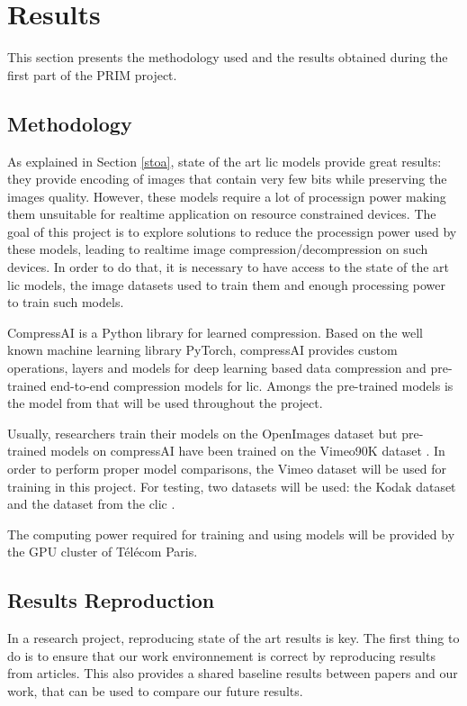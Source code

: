 \chapter{Results}
\label{results}
This section presents the methodology used and the results obtained during the first part of the PRIM project.

\section{Methodology}
As explained in Section \ref{stoa}, state of the art \acrshort{lic} models provide great results: they provide encoding of images that contain very few bits while preserving the images quality. However, these models require a lot of processign power making them unsuitable for realtime application on resource constrained devices. The goal of this project is to explore solutions to reduce the processign power used by these models, leading to realtime image compression/decompression on such devices. In order to do that, it is necessary to have access to the state of the art \acrshort{lic} models, the image datasets used to train them and enough processing power to train such models.

CompressAI \cite{compressai} is a Python library for learned compression. Based on the well known machine learning library PyTorch, compressAI provides custom operations, layers and models for deep learning based data compression and pre-trained end-to-end compression models for \acrshort{lic}. Amongs the pre-trained models is the model from \cite{ballemshj18} that will be used throughout the project.

Usually, researchers train their models on the OpenImages dataset \cite{openimages} but pre-trained models on compressAI have been trained on the Vimeo90K dataset \cite{xue2019video}. In order to perform proper model comparisons, the Vimeo dataset will be used for training in this project. For testing, two datasets will be used: the Kodak dataset \cite{kodak} and the dataset from the \acrfull{clic} \cite{clic}.

The computing power required for training and using models will be provided by the GPU cluster of Télécom Paris.

\section{Results Reproduction}
In a research project, reproducing state of the art results is key. The first thing to do is to ensure that our work environnement is correct by reproducing results from articles. This also provides a shared baseline results between papers and our work, that can be used to compare our future results.

